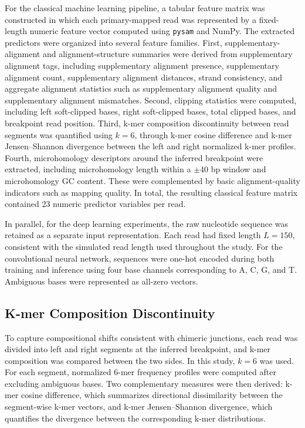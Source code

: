 For the classical machine learning pipeline, a tabular feature matrix was constructed in which each primary-mapped read was represented by a fixed-length numeric feature vector computed using \texttt{pysam} and NumPy. The extracted predictors were organized into several feature families. First, supplementary-alignment and alignment-structure summaries were derived from supplementary alignment tags, including supplementary alignment presence, supplementary alignment count, supplementary alignment distances, strand consistency, and aggregate alignment statistics such as supplementary alignment quality and supplementary alignment mismatches. Second, clipping statistics were computed, including left soft-clipped bases, right soft-clipped bases, total clipped bases, and breakpoint read position. Third, k-mer composition discontinuity between read segments was quantified using \(k=6\), through k-mer cosine difference and k-mer Jensen--Shannon divergence between the left and right normalized k-mer profiles. Fourth, microhomology descriptors around the inferred breakpoint were extracted, including microhomology length within a \(\pm 40\) bp window and microhomology GC content. These were complemented by basic alignment-quality indicators such as mapping quality. In total, the resulting classical feature matrix contained 23 numeric predictor variables per read.

In parallel, for the deep learning experiments, the raw nucleotide sequence was retained as a separate input representation. Each read had fixed length \(L=150\), consistent with the simulated read length used throughout the study. For the convolutional neural network, sequences were one-hot encoded during both training and inference using four base channels corresponding to A, C, G, and T. Ambiguous bases were represented as all-zero vectors.

\subsection{K-mer Composition Discontinuity}

To capture compositional shifts consistent with chimeric junctions, each read was divided into left and right segments at the inferred breakpoint, and k-mer composition was compared between the two sides. In this study, \(k=6\) was used. For each segment, normalized 6-mer frequency profiles were computed after excluding ambiguous bases. Two complementary measures were then derived: k-mer cosine difference, which summarizes directional dissimilarity between the segment-wise k-mer vectors, and k-mer Jensen--Shannon divergence, which quantifies the divergence between the corresponding k-mer distributions.

